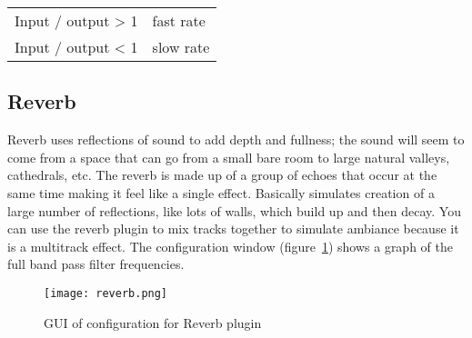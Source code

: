 \begin{center}
    \begin{tabular}{l l}
        \toprule
        Input / output > 1 &	fast rate \\
        Input / output < 1 &	slow rate \\
        \bottomrule
    \end{tabular}
\end{center}

\subsection{Reverb}%
\label{sub:reverb}

Reverb uses reflections of sound to add depth and fullness; the sound will seem to come from a space that can go from a small bare room to large natural valleys, cathedrals, etc. The reverb is made up of a group of echoes that occur at the same time making it feel like a single effect.
Basically simulates creation of a large number of reflections, like lots of walls, which build up and then decay. You can use the reverb plugin to mix tracks together to simulate ambiance because it is a multitrack effect.
The configuration window (figure~\ref{fig:reverb}) shows a graph of the full band pass filter frequencies.

\begin{figure}[htpb]
	\centering
	\texttt{[image: reverb.png]}
	\caption{GUI of configuration for Reverb plugin}
	\label{fig:reverb}
\end{figure}

